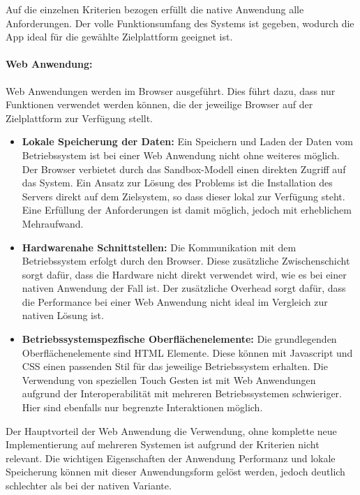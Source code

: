 Auf die einzelnen Kriterien bezogen erfüllt die native Anwendung alle Anforderungen. Der volle Funktionsumfang des Systems ist gegeben, wodurch die App ideal für die gewählte Zielplattform geeignet ist.

\paragraph{Web Anwendung: } Web Anwendungen werden im Browser ausgeführt. 
 Dies führt dazu, dass nur Funktionen verwendet werden können, die der jeweilige Browser auf der Zielplattform zur Verfügung stellt. 
 \begin{itemize}
 \item \textbf{Lokale Speicherung der Daten:} Ein Speichern und Laden der Daten vom Betriebssystem ist bei einer Web Anwendung nicht ohne weiteres möglich. Der Browser verbietet durch das Sandbox-Modell einen direkten Zugriff auf das System.  Ein Ansatz zur Lösung des Problems ist die Installation des Servers direkt auf dem Zielsystem, so dass dieser lokal zur Verfügung steht. Eine Erfüllung der Anforderungen ist damit möglich, jedoch mit erheblichem Mehraufwand. 
 
 \item \textbf{Hardwarenahe Schnittstellen:} Die Kommunikation mit dem Betriebssystem erfolgt durch den Browser. Diese zusätzliche Zwischenschicht sorgt dafür, dass die Hardware nicht direkt verwendet wird, wie es bei einer nativen Anwendung der Fall ist. Der zusätzliche Overhead sorgt dafür, dass die Performance bei einer Web Anwendung nicht ideal im Vergleich zur nativen Lösung ist.
 
 \item \textbf{Betriebssystemspezfische Oberflächenelemente:} Die grundlegenden Oberflächenelemente sind HTML Elemente. Diese können mit Javascript und CSS einen passenden Stil für das jeweilige Betriebssystem erhalten. Die Verwendung von speziellen Touch Gesten ist mit Web Anwendungen aufgrund der Interoperabilität mit mehreren Betriebssystemen schwieriger. Hier sind ebenfalls nur begrenzte Interaktionen möglich.
 
 \end{itemize}
 Der Hauptvorteil der Web Anwendung die Verwendung, ohne komplette neue Implementierung auf mehreren Systemen ist aufgrund der Kriterien nicht relevant. Die wichtigen Eigenschaften der Anwendung Performanz und lokale Speicherung können mit dieser Anwendungsform gelöst werden, jedoch deutlich schlechter als bei der nativen Variante.


